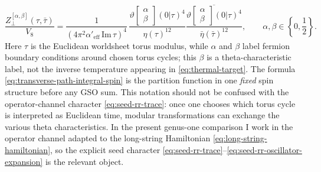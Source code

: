 \documentclass[11pt]{article}
\newcommand{\Aeff}{\alpha'_{\mathrm{eff}}}
\begin{document}
\begin{equation}\label{eq:transverse-path-integral-spin}
\frac{Z_{\perp}^{[\alpha,\beta]}(\tau,\bar\tau)}{V_8}
=
\frac{1}{(4\pi^2 \Aeff\,\mathrm{Im}\,\tau)^4}\,
\frac{\vartheta\!\begin{bmatrix}\alpha\\ \beta\end{bmatrix}\!(0|\tau)^4}{\eta(\tau)^{12}}
\frac{\overline{\vartheta\!\begin{bmatrix}\alpha\\ \beta\end{bmatrix}\!(0|\tau)^4}}{\bar\eta(\bar\tau)^{12}},
\qquad
\alpha,\beta\in\left\{0,\frac12\right\}.
\end{equation}
Here $\tau$ is the Euclidean worldsheet torus modulus, while $\alpha$ and $\beta$ label fermion boundary conditions around chosen torus cycles; this $\beta$ is a theta-characteristic label, not the inverse temperature appearing in \eqref{eq:thermal-target}. The formula \eqref{eq:transverse-path-integral-spin} is the partition function in one \emph{fixed} spin structure before any GSO sum. This notation should not be confused with the operator-channel character \eqref{eq:seed-rr-trace}: once one chooses which torus cycle is interpreted as Euclidean time, modular transformations can exchange the various theta characteristics. In the present genus-one comparison I work in the operator channel adapted to the long-string Hamiltonian \eqref{eq:long-string-hamiltonian}, so the explicit seed character \eqref{eq:seed-rr-trace}--\eqref{eq:seed-rr-oscillator-expansion} is the relevant object.
\end{document}
